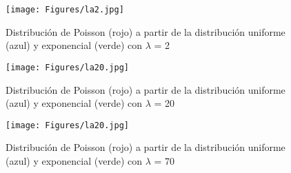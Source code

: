 \documentclass{article}
\begin{document}
\begin{figure}
\centering
\texttt{[image: Figures/la2.jpg]}
\caption{Distribución de Poisson (rojo) a partir de la distribución uniforme (azul) y exponencial (verde) con $\lambda$ = 2}
\label{la2}
\end{figure}
	
\begin{figure}
\centering
\texttt{[image: Figures/la20.jpg]}
\caption{Distribución de Poisson (rojo) a partir de la distribución uniforme (azul) y exponencial (verde) con $\lambda$ = 20}
\label{la20}
\end{figure}

\begin{figure}
\centering
\texttt{[image: Figures/la20.jpg]}
\caption{Distribución de Poisson (rojo) a partir de la distribución uniforme (azul) y exponencial (verde) con $\lambda$ = 70}
\label{la70}
\end{figure}



\end{document}
